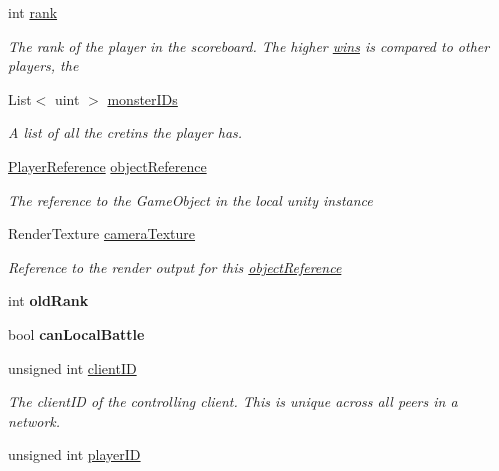\begin{DoxyCompactItemize}
int \hyperlink{class_game_state_1_1_player_aa6cd14ba1f335990c39dd99334933147}{rank}
\begin{DoxyCompactList}\small\item\em The rank of the player in the scoreboard. The higher \hyperlink{class_game_state_1_1_player_a3a4d13459cad9bd58e058ddc6387af70}{wins} is compared to other players, the \end{DoxyCompactList}\item 
List$<$ uint $>$ \hyperlink{class_game_state_1_1_player_a2c4ed3c60a2969cd4f891e12c8265377}{monster\-I\-Ds}
\begin{DoxyCompactList}\small\item\em A list of all the cretins the player has. \end{DoxyCompactList}\item 
\hyperlink{class_player_reference}{Player\-Reference} \hyperlink{class_game_state_1_1_player_aebf24de01e14055dc940d0493753484f}{object\-Reference}
\begin{DoxyCompactList}\small\item\em The reference to the Game\-Object in the local unity instance \end{DoxyCompactList}\item 
Render\-Texture \hyperlink{class_game_state_1_1_player_ac1f7e0b5bc335c32c3be71e3653787a6}{camera\-Texture}
\begin{DoxyCompactList}\small\item\em Reference to the render output for this \hyperlink{class_game_state_1_1_player_aebf24de01e14055dc940d0493753484f}{object\-Reference} \end{DoxyCompactList}\item 
\hypertarget{class_game_state_1_1_player_a45f28f490b11d9590a356bbea538a669}{int {\bfseries old\-Rank}}\label{class_game_state_1_1_player_a45f28f490b11d9590a356bbea538a669}

\item 
\hypertarget{class_game_state_1_1_player_a8222ced218f1e9ab024beada9f8f92a7}{bool {\bfseries can\-Local\-Battle}}\label{class_game_state_1_1_player_a8222ced218f1e9ab024beada9f8f92a7}

\item 
\hypertarget{class_game_state_1_1_player_a1bef4cd92306bd5cf330c4756e63686c}{unsigned int \hyperlink{class_game_state_1_1_player_a1bef4cd92306bd5cf330c4756e63686c}{client\-I\-D}}\label{class_game_state_1_1_player_a1bef4cd92306bd5cf330c4756e63686c}

\begin{DoxyCompactList}\small\item\em The client\-I\-D of the controlling client. This is unique across all peers in a network. \end{DoxyCompactList}\item 
\hypertarget{class_game_state_1_1_player_ac71d68698435ee1c625237b1f2b377cb}{unsigned int \hyperlink{class_game_state_1_1_player_ac71d68698435ee1c625237b1f2b377cb}{player\-I\-D}}\label{class_game_state_1_1_player_ac71d68698435ee1c625237b1f2b377cb}


\end{DoxyCompactItemize}
